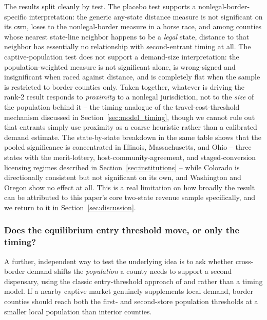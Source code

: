 \documentclass[12pt]{article}
\begin{document}
The results split cleanly by test. The placebo test supports a nonlegal-border-specific interpretation: the
generic any-state distance measure is not significant on its own, loses to the nonlegal-border measure in a
horse race, and among counties whose nearest state-line neighbor happens to be a \emph{legal} state, distance
to that neighbor has essentially no relationship with second-entrant timing at all. The captive-population
test does not support a demand-size interpretation: the population-weighted measure is not significant
alone, is wrong-signed and insignificant when raced against distance, and is completely flat when the sample
is restricted to border counties only. Taken together, whatever is driving the rank-2 result responds to
\emph{proximity} to a nonlegal jurisdiction, not to the \emph{size} of the population behind it -- the
timing analogue of the travel-cost-threshold mechanism discussed in Section~\ref{sec:model_timing}, though
we cannot rule out that entrants simply use proximity as a coarse heuristic rather than a calibrated demand
estimate. The state-by-state breakdown in the same table shows that the pooled significance is concentrated
in Illinois, Massachusetts, and Ohio -- three states with the merit-lottery, host-community-agreement, and
staged-conversion licensing regimes described in Section~\ref{sec:institutions} -- while Colorado is
directionally consistent but not significant on its own, and Washington and Oregon show no effect at all.
This is a real limitation on how broadly the result can be attributed to this paper's core two-state revenue
sample specifically, and we return to it in Section~\ref{sec:discussion}.

\subsubsection{Does the equilibrium entry threshold move, or only the timing?}
A further, independent way to test the underlying idea is to ask whether cross-border demand shifts the
\emph{population} a county needs to support a second dispensary, using the classic entry-threshold approach
of \citet{BresnahanReiss1990} and \citet{BresnahanReiss1991} rather than a timing model. If a nearby captive
market genuinely supplements local demand, border counties should reach both the first- and second-store
population thresholds at a smaller local population than interior counties.


\end{document}
